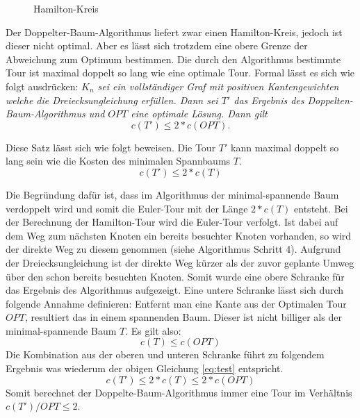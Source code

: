 \documentclass{article}
\begin{document}
\begin{figure}[H]
\centering
{}
\caption{Hamilton-Kreis}
\label{fig:ursprungs-graf-hamiltonkreis}
\end{figure}

Der Doppelter-Baum-Algorithmus liefert zwar einen Hamilton-Kreis, jedoch ist dieser nicht optimal. Aber es lässt sich trotzdem eine obere Grenze der Abweichung zum Optimum bestimmen. Die durch den Algorithmus bestimmte Tour ist maximal doppelt so lang wie eine optimale Tour. Formal lässt es sich wie folgt ausdrücken:
\textit{$K_n$ sei ein vollständiger Graf mit positiven Kantengewichten welche die Dreiecksungleichung erfüllen. Dann sei $T'$ das Ergebnis des Doppelten-Baum-Algorithmus und $OPT$ eine optimale Lösung. Dann gilt
\begin{equation}
c(T') \leq 2 * c(OPT).
\label{eq:test}
\end{equation}}

Diese Satz lässt sich wie folgt beweisen. Die Tour $T'$ kann maximal doppelt so lang sein wie die Kosten des minimalen Spannbaums $T$. 
\begin{equation}
c(T') \leq 2 * c(T)
\end{equation}


Die Begründung dafür ist, dass im Algorithmus der minimal-spannende Baum verdoppelt wird und somit die Euler-Tour mit der Länge $2 * c(T)$ entsteht. Bei der Berechnung der Hamilton-Tour wird die Euler-Tour verfolgt. Ist dabei auf dem Weg zum nächsten Knoten ein bereits besuchter Knoten vorhanden, so wird der direkte Weg zu diesem genommen (siehe Algorithmus Schritt 4). Aufgrund der Dreiecksungleichung ist der direkte Weg kürzer als der zuvor geplante Umweg über den schon bereits besuchten Knoten. Somit wurde eine obere Schranke für das Ergebnis des Algorithmus aufgezeigt. Eine untere Schranke lässt sich durch folgende Annahme definieren: Entfernt man eine Kante aus der Optimalen Tour $OPT$, resultiert das in einem spannenden Baum. Dieser ist nicht billiger als der minimal-spannende Baum $T$. Es gilt also: 
\begin{equation}
c(T) \leq c(OPT)
\end{equation}
Die Kombination aus der oberen und unteren Schranke führt zu folgendem Ergebnis was wiederum der obigen Gleichung \ref{eq:test} entspricht.
\begin{equation}
c(T') \leq 2 * c(T) \leq 2 * c(OPT)
\end{equation}
Somit berechnet der Doppelte-Baum-Algorithmus immer eine Tour im Verhältnis $c(T')/OPT \leq 2$.
\end{document}
